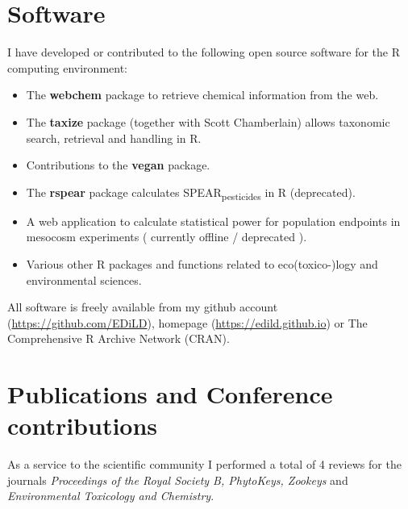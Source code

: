 \documentclass[11pt,a4paper,sans]{moderncv}   %
\newcommand*{\boldname}[3]{%
  \def\lastname{#1}%
  \def\firstname{#2}%
  \def\firstinit{#3}}
\begin{document}
\section{Software}
I have developed or contributed to the following open source software for the R computing environment:
\vspace{0.5em}
\begin{itemize}
     \item The \textbf{webchem} package to retrieve chemical information from the web.
	\item The \textbf{taxize} package (together with Scott Chamberlain) allows taxonomic search, retrieval and handling in R.
	\item Contributions to the \textbf{vegan} package.
	\item The \textbf{rspear} package calculates SPEAR\textsubscript{pesticides} in R (deprecated).
	\item A web application to calculate statistical power for population endpoints in mesocosm experiments ( currently offline / deprecated
          ).
	\item Various other R packages and functions related to eco(toxico-)logy and environmental sciences.
\end{itemize}
\vspace{0.5em}
All software is freely available from my github account (\url{https://github.com/EDiLD}), homepage (\url{https://edild.github.io}) or The Comprehensive R Archive Network (CRAN).

\vspace{1em}
\newpage

\section{Publications and Conference contributions}
\begin{refsection}[papers]
  \nocite{*}
  \boldname{Szöcs}{}{}
  \printbibliography[title={Articles}, heading=subbibliography]
\end{refsection}

\begin{refsection}[posters]
  \nocite{*}
  \boldname{Szöcs}{}{}
  \printbibliography[title={Poster}, heading=subbibliography]
\end{refsection}

As a service to the scientific community I performed a total of 4 reviews for the journals \emph{Proceedings of the Royal Society B, PhytoKeys, Zookeys} and \emph{Environmental Toxicology and Chemistry}.
\end{document}
